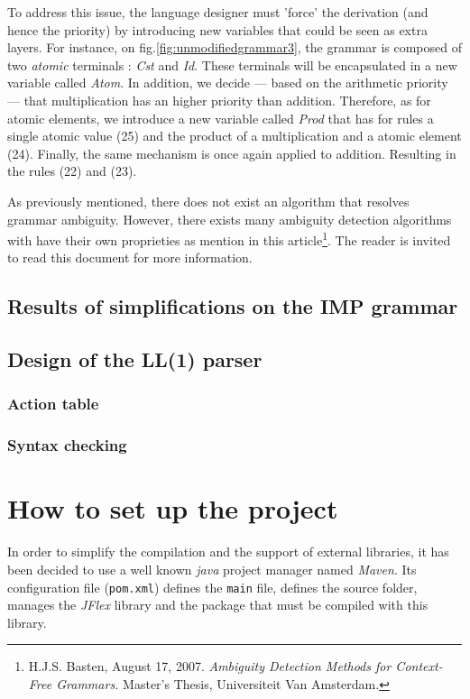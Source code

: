 \documentclass[a4paper,11pt]{article}
\begin{document}
      To address this issue, the language designer must 'force' the derivation (and hence the priority) by introducing new variables that could be seen as extra layers. For instance, on fig.\ref{fig:unmodifiedgrammar3}, the grammar is composed of two \textit{atomic} terminals : \textit{Cst} and \textit{Id}. These terminals will be encapsulated in a new variable called \textit{Atom}. In addition, we decide --- based on the arithmetic priority --- that multiplication has an higher priority than addition. Therefore, as for atomic elements, we introduce a new variable called \textit{Prod} that has for rules a single atomic value (25) and the product of a multiplication and a atomic element (24). Finally, the same mechanism is once again applied to addition. Resulting in the rules (22) and (23).\\
      \begin{tcolorbox}
        As previously mentioned, there does not exist an algorithm that resolves grammar ambiguity. However, there exists many ambiguity detection algorithms with have their own proprieties as mention in this article\footnote{H.J.S. Basten, August 17, 2007. \textit{Ambiguity Detection Methods for Context-Free Grammars.} Master's Thesis, Universiteit Van Amsterdam.}. The reader is invited to read this document for more information.
      \end{tcolorbox}
  
  \subsection{Results of simplifications on the IMP grammar}
    
  \subsection{Design of the LL(1) parser}
  
    \subsubsection{Action table}
      
    \subsubsection{Syntax checking}

\section{How to set up the project}
  In order to simplify the compilation and the support of external libraries, it has been decided to use a well known \textit{java} project manager named \textit{Maven}. Its configuration file (\verb|pom.xml|) defines the \verb|main| file, defines the source folder, manages the \textit{JFlex} library and the package that must be compiled with this library.
\end{document}

